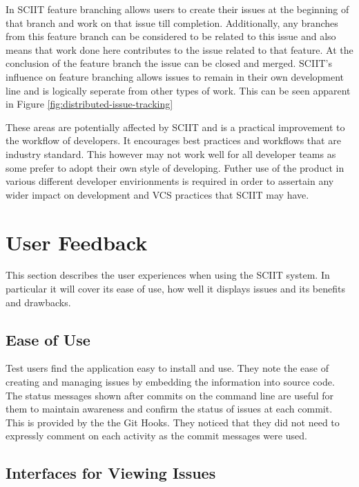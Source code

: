 \documentclass{mproj}
\begin{document}
In SCIIT feature branching allows users to create their issues at the beginning of that branch and work on that issue till completion. Additionally, any branches from this feature branch can be considered to be related to this issue and also means that work done here contributes to the issue related to that feature. At the conclusion of the feature branch the issue can be closed and merged. SCIIT's influence on feature branching allows issues to remain in their own development line and is logically seperate from other types of work. This can be seen apparent in Figure \ref{fig:distributed-issue-tracking}

These areas are potentially affected by SCIIT and is a practical improvement to the workflow of developers. It encourages best practices and workflows that are industry standard. This however may not work well for all developer teams as some prefer to adopt their own style of developing. Futher use of the product in various different developer envirionments is required in order to assertain any wider impact on development and VCS practices that SCIIT may have.



\section{User Feedback}

This section describes the user experiences when using the SCIIT system. In particular it will cover its ease of use, how well it displays issues and its benefits and drawbacks.

\subsection{Ease of Use}

Test users find the application easy to install and use. They note the ease of creating and managing issues by embedding the information into source code. The status messages shown after commits on the command line are useful for them to maintain awareness and confirm the status of issues at each commit. This is provided by the the Git Hooks. They noticed that they did not need to expressly comment on each activity as the commit messages were used.

\subsection{Interfaces for Viewing Issues}
\end{document}
